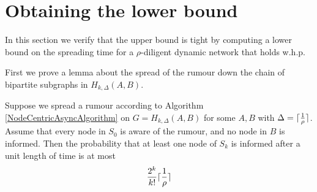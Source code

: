 \section{Obtaining the lower bound}\label{section:adversarialLowerBound}

In this section we verify that the upper bound is tight by computing a lower bound on the spreading time for a $\rho$-diligent dynamic network that holds w.h.p.

First we prove a lemma about the spread of the rumour down the chain of bipartite subgraphs in $H_{k, \Delta}(A,B)$.

\begin{lemma}\label{lemma:H_k,DeltaABOneStep}
	Suppose we spread a rumour according to Algorithm \ref{NodeCentricAsyncAlgorithm} on $G = H_{k, \Delta}(A,B)$ for some $A, B$ with $\Delta = \lceil\frac{1}{\rho}\rceil$. Assume that every node in $S_0$ is aware of the rumour, and no node in $B$ is informed. Then the probability that at least one node of $S_k$ is informed after a unit length of time is at most
	$$
		\frac{2^k}{k!}\lceil\frac{1}{\rho}\rceil
	$$	
\end{lemma}

